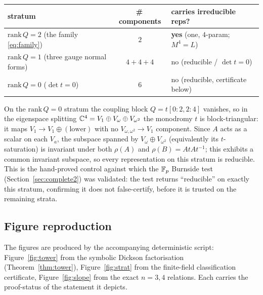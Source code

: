 \begin{center}\small
\begin{tabular}{lcl}
\toprule
stratum & \#\,components & carries irreducible reps? \\
\midrule
$\mathrm{rank}\,Q=2$ (the family \eqref{eq:family}) & $2$ & \textbf{yes} (one, $4$-param; $M^4=L$) \\
$\mathrm{rank}\,Q=1$ (three gauge normal forms) & $4+4+4$ & no (reducible / $\det t=0$) \\
$\mathrm{rank}\,Q=0$ ($\det t=0$) & $6$ & no (reducible, certificate below) \\
\bottomrule
\end{tabular}
\end{center}

On the $\mathrm{rank}\,Q=0$ stratum the coupling block $Q=t[0{:}2,2{:}4]$ vanishes, so in the eigenspace
splitting $\mathbb{C}^4=V_1\oplus V_\omega\oplus V_{\omega^2}$ the monodromy $t$ is block-triangular: it maps
$V_1\to V_1\oplus(\text{lower})$ with no $V_{\omega,\omega^2}\to V_1$ component. Since $A$ acts as a scalar
on each $V_{a}$, the subspace spanned by $V_\omega\oplus V_{\omega^2}$ (equivalently its $t$-saturation) is
invariant under both $\rho(A)$ and $\rho(B)=AtAt^{-1}$; this exhibits a common invariant subspace, so every
representation on this stratum is reducible. This is the hand-proved control against which the $\mathbb{F}_p$
Burnside test (Section~\ref{sec:complete2}) was validated: the test returns ``reducible'' on exactly this
stratum, confirming it does not false-certify, before it is trusted on the remaining strata.

\subsection{Figure reproduction} The figures are produced by the accompanying deterministic script:
Figure~\ref{fig:tower} from the symbolic Dickson factorisation (Theorem~\ref{thm:tower}),
Figure~\ref{fig:strat} from the finite-field classification certificate, Figure~\ref{fig:slope} from the
exact $n=3,4$ relations. Each carries the proof-status of the statement it depicts.
